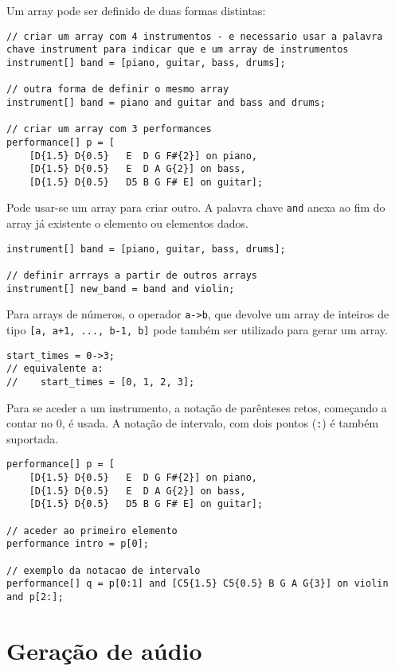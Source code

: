 \documentclass{article}
\begin{document}
Um array pode ser definido de duas formas distintas:
\begin{lstlisting} 
// criar um array com 4 instrumentos - e necessario usar a palavra chave instrument para indicar que e um array de instrumentos
instrument[] band = [piano, guitar, bass, drums];

// outra forma de definir o mesmo array
instrument[] band = piano and guitar and bass and drums;

// criar um array com 3 performances
performance[] p = [
    [D{1.5} D{0.5}   E  D G F#{2}] on piano, 
    [D{1.5} D{0.5}   E  D A G{2}] on bass,
    [D{1.5} D{0.5}   D5 B G F# E] on guitar];
\end{lstlisting} 

Pode usar-se um array para criar outro. A palavra chave \texttt{and} anexa ao fim do array já existente o elemento ou elementos dados.

\begin{lstlisting} 
instrument[] band = [piano, guitar, bass, drums];

// definir arrrays a partir de outros arrays
instrument[] new_band = band and violin;
\end{lstlisting} 

Para arrays de números, o operador \texttt{a->b}, que devolve um array de inteiros de tipo \texttt{[a, a+1, ..., b-1, b]} pode também ser utilizado para gerar um array.
\begin{lstlisting}
start_times = 0->3;
// equivalente a:
//    start_times = [0, 1, 2, 3];
\end{lstlisting}

Para se aceder a um instrumento, a notação de parênteses retos, começando a contar no 0, é usada. A notação de intervalo, com dois pontos (\texttt{:}) é também suportada.
\begin{lstlisting} 
performance[] p = [
    [D{1.5} D{0.5}   E  D G F#{2}] on piano, 
    [D{1.5} D{0.5}   E  D A G{2}] on bass,
    [D{1.5} D{0.5}   D5 B G F# E] on guitar];
    
// aceder ao primeiro elemento
performance intro = p[0];

// exemplo da notacao de intervalo
performance[] q = p[0:1] and [C5{1.5} C5{0.5} B G A G{3}] on violin and p[2:];
\end{lstlisting}


\section{Geração de aúdio} \label{audio}
\end{document}
